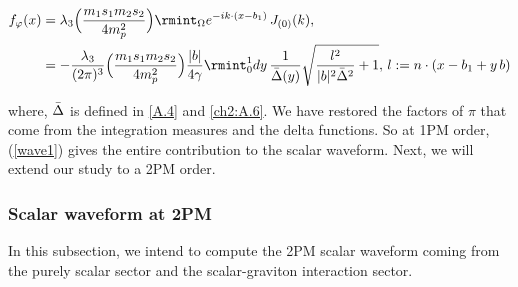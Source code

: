 \begin{equation}\label{wave1}\begin{split}
  f_{\varphi}(x)&= \lambda_3\Big(\frac{m_1s_1m_2s_2}{4m_p^2}\Big) \rmint_{\Omega}e^{-ik\cdot (x-b_1)}\,J_{(0)}(k),\\ &
        =-\frac{\lambda_3}{(2\pi)^3}\Big(\frac{m_1s_1m_2s_2}{4m_p^2}\Big) \frac{|b|}{4\gamma}\rmint_{0}^{1}dy\,\frac{1}{\Bar\Delta(y)}\sqrt{\frac{l^2}{|b|^2\bar\Delta^2}+1},\,l:=n\cdot(x-b_1+y\,b)\\
        \end{split}
\end{equation}
\vspace{0.5 cm}

where, $\Bar\Delta$ is defined in \eqref{A.4} and \eqref{ch2:A.6}. We have restored the factors of $\pi$ that come from the integration measures and the delta functions. So at 1PM order, (\ref{wave1}) gives the entire contribution to the scalar waveform. Next, we will extend our study to a 2PM order.


\subsubsection{Scalar waveform at 2PM}
In this subsection, we intend to compute the 2PM scalar waveform coming from the purely scalar sector and the scalar-graviton interaction sector.

